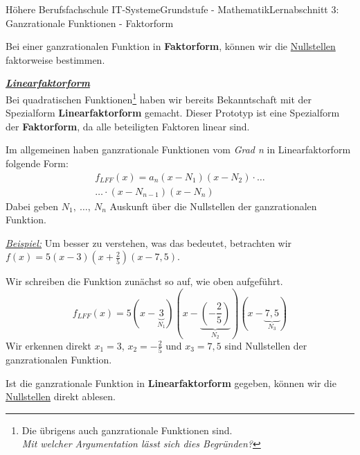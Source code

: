 \documentclass[11pt,twocolumn,oneside,openany,headings=optiontotoc,11pt,numbers=noenddot]{article}
\begin{document}
\begin{worksheet}{Höhere Berufsfachschule IT-Systeme}{Grundstufe - Mathematik}{Lernabschnitt 3: Ganzrationale Funktionen - Faktorform}
\begin{framed}
			\noindent
			Bei einer ganzrationalen Funktion in \textbf{Faktorform}, können wir die \underline{Nullstellen} faktorweise bestimmen.
		\end{framed}
		\par
		\underline{\textbf{\textit{Linearfaktorform}}}\\
		Bei quadratischen Funktionen\footnote{Die übrigens auch ganzrationale Funktionen sind.\\ \textit{Mit welcher Argumentation lässt sich dies Begründen?}} haben wir bereits Bekanntschaft mit der Spezialform  \textbf{Linearfaktorform} gemacht. Dieser Prototyp ist eine Spezialform der \textbf{Faktorform}, da alle beteiligten Faktoren linear sind.\\
		\par\noindent
		Im allgemeinen haben ganzrationale Funktionen vom \textit{Grad n} in Linearfaktorform folgende Form: \begin{align*}
			f_{LFF}(x) = a_n(x-N_1)(x-N_2)\cdot\ldots\\
			\ldots\cdot(x-N_{n-1})(x-N_n)
		\end{align*}
		Dabei geben \(N_1,\ \ldots,\ N_n\) Auskunft über die Nullstellen der ganzrationalen Funktion.\\
		\par\noindent
		\underline{\textit{Beispiel:}} Um besser zu verstehen, was das bedeutet, betrachten wir \(f(x) = 5(x-3)(x+\frac{2}{5})(x-7,5)\).\\
		\par\noindent
		Wir schreiben die Funktion zunächst so auf, wie oben aufgeführt. \[f_{LFF}(x) = 5(x-\underbrace{3}_{N_1})(x-\underbrace{(-\frac{2}{5})}_{N_2})(x-\underbrace{7,5}_{N_3})\]
		Wir erkennen direkt \colorbox{green!10}{\(x_1 = 3\)}, \colorbox{green!10}{\(x_2 = -\frac{2}{5}\)} und \colorbox{green!10}{\(x_3 = 7,5\)} sind Nullstellen der ganzrationalen Funktion.
		\begin{framed}
			\noindent
			Ist die ganzrationale Funktion in \textbf{Linearfaktorform} gegeben, können wir die \underline{Nullstellen} direkt ablesen.
		\end{framed}

\end{worksheet}
\end{document}
